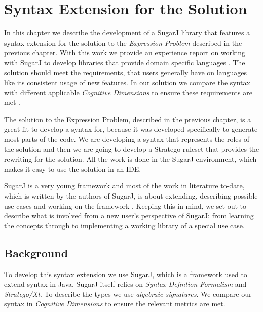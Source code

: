 \documentclass{report}
\begin{document}





\chapter{Syntax Extension for the Solution}

\label{chapterOurSolutionSyntaxExtension}

In this chapter we describe the development of a SugarJ library that features a syntax extension for the solution to the \emph{Expression Problem} described in the previous chapter. With this work we provide an experience report on working with SugarJ to develop libraries that provide domain specific languages \cite{Erdweg-SugarJ-2011}. The solution should meet the requirements, that users generally have on languages like its consistent usage of new features. In our solution we compare the syntax with different applicable \emph{Cognitive Dimensions} to ensure these requirements are met \cite{Green-Cognitive-1996}.

The solution to the Expression Problem, described in the previous chapter, is a great fit to develop a syntax for, because it was developed specifically to generate most parts of the code. We are developing a syntax that represents the roles of the solution and then we are going to develop a Stratego ruleset that provides the rewriting for the solution. All the work is done in the SugarJ environment, which makes it easy to use the solution in an IDE.

SugarJ is a very young framework and most of the work in literature to-date, which is written by the authors of SugarJ, is about extending, describing possible use cases and working on the framework \cite{Fehrenbach-Retrofitting-2011, Erdweg-Composition-2012, Erdweg-Editor-2011, Erdweg-SugarHaskell-2012, Erdweg-Questionnaire-2013}. Keeping this in mind, we set out to describe what is involved from a new user's perspective of SugarJ: from learning the concepts through to implementing a working library of a special use case.

\section{Background}

To develop this syntax extension we use SugarJ, which is a framework used to extend syntax in Java. SugarJ itself relies on \emph{Syntax Defintion Formalism} and \emph{Stratego/Xt}. To describe the types we use \emph{algebraic signatures}. We compare our syntax in \emph{Cognitive Dimensions} to ensure the relevant metrics are met.
\end{document}
